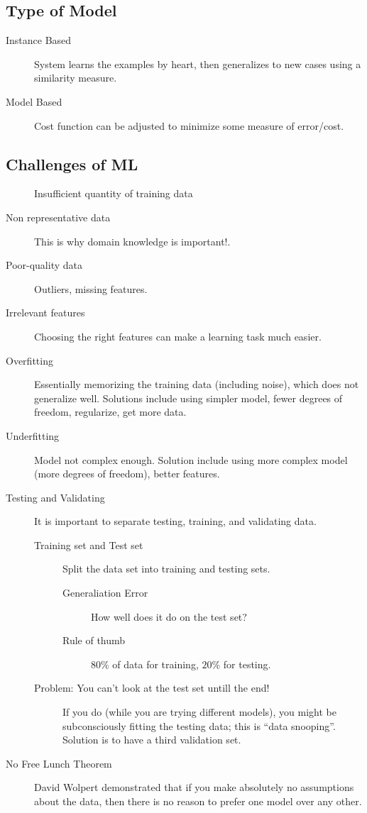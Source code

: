 \documentclass[10pt]{article}
\begin{document}
\subsection{Type of Model}%
\label{sub:type_of_model}

\begin{description}
  \item[Instance Based] System learns the examples by heart, then generalizes
    to new cases using a similarity measure.
  \item[Model Based] Cost function can be adjusted to minimize some measure of
    error/cost.
\end{description}

\subsection{Challenges of ML}%
\label{sub:challenges_of_ml}

\begin{description}
  \item[] Insufficient quantity of training data
  \item[Non representative data] This is why domain knowledge is important!.
  \item[Poor-quality data] Outliers, missing features.
  \item[Irrelevant features] Choosing the right features can make a learning
    task much easier.
  \item[Overfitting] Essentially memorizing the training data (including
    noise), which does not generalize well. Solutions include using simpler
    model, fewer degrees of freedom, regularize, get more data.
  \item[Underfitting] Model not complex enough. Solution include using more
    complex model (more degrees of freedom), better features.
  \item[Testing and Validating]
    It is important to separate testing, training, and validating data.
    \begin{description}
      \item[Training set and Test set]
        Split the data set into training and testing sets.
        \begin{description}
          \item[Generaliation Error] How well does it do on the test set?
          \item[Rule of thumb] $80\%$ of data for training, $20\%$ for testing.
        \end{description}
      \item[Problem: You can't look at the test set untill the end!] If you do
        (while you are trying different models), you might be subconsciously
        fitting the testing data; this is ``data snooping''. Solution is to have
        a third validation set.
    \end{description}
  \item[No Free Lunch Theorem] David Wolpert demonstrated that if you make
    absolutely no assumptions about the data, then there is no reason to prefer
    one model over any other.
\end{description}
\end{document}
